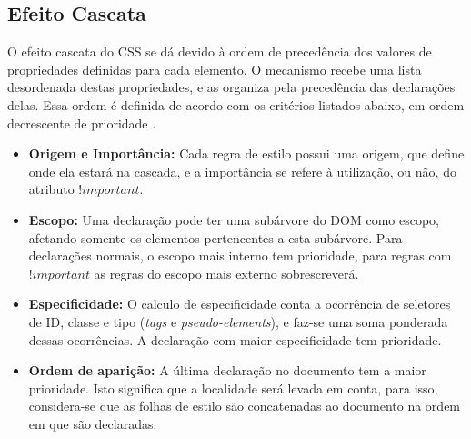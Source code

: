 \subsection{Efeito Cascata}
\label{subsec:cascade}

O efeito cascata do CSS se dá devido à ordem de precedência dos valores de propriedades definidas para cada elemento. O mecanismo recebe uma lista desordenada destas propriedades, e as organiza pela precedência das declarações delas. Essa ordem é definida de acordo com os critérios listados abaixo, em ordem decrescente de prioridade \cite{CSScascade2015}.

\begin{itemize}
	\item \textbf{Origem e Importância:} 
	Cada regra de estilo possui uma origem, que define onde ela estará na cascada, e a importância se refere à utilização, ou não, do atributo $!important$.
	\item \textbf{Escopo:}
	Uma declaração pode ter uma subárvore do DOM como escopo, afetando somente os elementos pertencentes a esta subárvore. Para declarações normais, o escopo mais interno tem prioridade, para regras com $!important$ as regras do escopo mais externo sobrescreverá.
	\item \textbf{Especificidade:}
	O calculo de especificidade conta a ocorrência de seletores de ID, classe e tipo (\textit{tags} e \textit{pseudo-elements}), e faz-se uma soma ponderada dessas ocorrências. A declaração com maior especificidade tem prioridade.
	\item \textbf{Ordem de aparição:}
	A última declaração no documento tem a maior prioridade. Isto significa que a localidade será levada em conta, para isso, considera-se que as folhas de estilo são concatenadas ao documento na ordem em que são declaradas.
\end{itemize}


